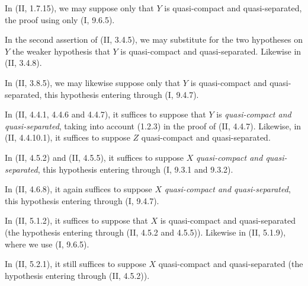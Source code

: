 \begin{env}[1.7.10]
\label{IV.1.7.10}
In (II, 1.7.15), we may suppose only that $Y$ is quasi-compact and
quasi-separated, the proof using only (I, 9.6.5).
\end{env}

\begin{env}[1.7.11]
\label{IV.1.7.11}
In the second assertion of (II, 3.4.5), we may substitute for the two
hypotheses on $Y$ the weaker hypothesis that $Y$ is quasi-compact and
quasi-separated. Likewise in (II, 3.4.8).
\end{env}

\begin{env}[1.7.12]
\label{IV.1.7.12}
In (II, 3.8.5), we may likewise suppose only that $Y$ is quasi-compact
and quasi-separated, this hypothesis entering through (I, 9.4.7).
\end{env}

\begin{env}[1.7.13]
\label{IV.1.7.13}
In (II, 4.4.1, 4.4.6 and 4.4.7), it suffices to suppose that $Y$ is
\emph{quasi-compact and quasi-separated}, taking into account (1.2.3) in the
proof of (II, 4.4.7). Likewise, in (II, 4.4.10.1), it suffices to
suppose $Z$ quasi-compact and quasi-separated.
\end{env}

\begin{env}[1.7.14]
\label{IV.1.7.14}
In (II, 4.5.2) and (II, 4.5.5), it suffices to suppose $X$
\emph{quasi-compact and quasi-separated}, this hypothesis entering through (I,
9.3.1 and 9.3.2).
\end{env}

\begin{env}[1.7.15]
\label{IV.1.7.15}
In (II, 4.6.8), it again suffices to suppose $X$ \emph{quasi-compact and
quasi-separated}, this hypothesis entering through (I, 9.4.7).
\end{env}

\begin{env}[1.7.16]
\label{IV.1.7.16}
In (II, 5.1.2), it suffices to suppose that $X$ is quasi-compact and
quasi-separated (the hypothesis entering through (II, 4.5.2 and 4.5.5)).
Likewise in (II, 5.1.9), where we use (I, 9.6.5).
\end{env}

\begin{env}[1.7.17]
\label{IV.1.7.17}
In (II, 5.2.1), it still suffices to suppose $X$ quasi-compact and
quasi-separated (the hypothesis entering through (II, 4.5.2)).
\end{env}


